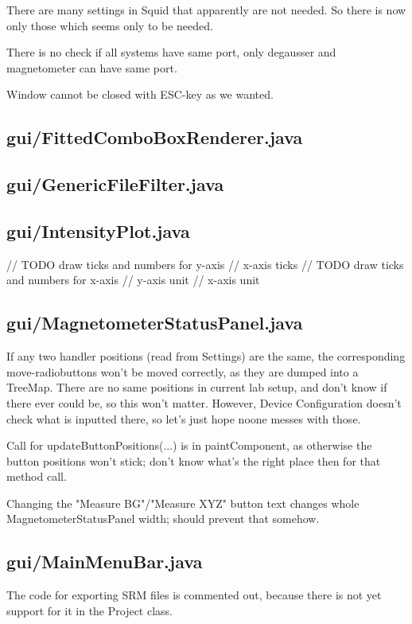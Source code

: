 There are many settings in Squid that apparently are not needed. So there is now only those which seems only to be needed.

There is no check if all systems have same port, only degausser and magnetometer can have same port.

Window cannot be closed with ESC-key as we wanted.


\subsection{gui/FittedComboBoxRenderer.java}

\subsection{gui/GenericFileFilter.java}

\subsection{gui/IntensityPlot.java}
        // TODO draw ticks and numbers for y-axis
        // x-axis ticks
        // TODO draw ticks and numbers for x-axis
        // y-axis unit
        // x-axis unit

\subsection{gui/MagnetometerStatusPanel.java}

If any two handler positions (read from Settings) are the same, the corresponding move-radiobuttons won't be moved correctly, as they are dumped into a TreeMap. There are no same positions in current lab setup, and don't know if there ever could be, so this won't matter. However, Device Configuration doesn't check what is inputted there, so let's just hope noone messes with those.

Call for updateButtonPositions(...) is in paintComponent, as otherwise the button positions won't stick; don't know what's the right place then for that method call.

Changing the "Measure BG"/"Measure XYZ" button text changes whole MagnetometerStatusPanel width; should prevent that somehow.


\subsection{gui/MainMenuBar.java}

The code for exporting SRM files is commented out, because there is not yet support for it in the Project class.


